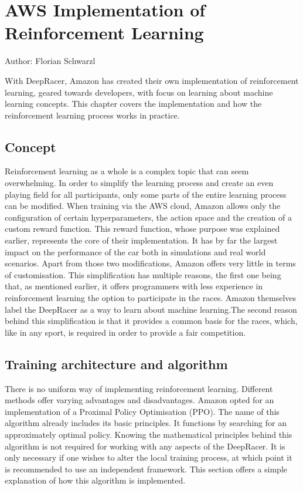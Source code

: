 \chapter{AWS Implementation of Reinforcement Learning}
Author: Florian Schwarzl

With DeepRacer, Amazon has created their own implementation of reinforcement learning, geared towards developers, with focus on learning about machine learning concepts. This chapter covers the implementation and how the reinforcement learning process works in practice.

\section{Concept}
Reinforcement learning as a whole is a complex topic that can seem overwhelming. In order to simplify the learning process and create an even playing field for all participants, only some parts of the entire learning process can be modified. When training via the AWS cloud, Amazon allows only the configuration of certain hyperparameters, the action space and the creation of a custom reward function. This reward function, whose purpose was explained earlier, represents the core of their implementation. It has by far the largest impact on the performance of the car both in simulations and real world scenarios. Apart from those two modifications, Amazon offers very little in terms of customisation. This simplification has multiple reasons, the first one being that, as mentioned earlier, it offers programmers with less experience in reinforcement learning the option to participate in the races. Amazon themselves label the DeepRacer as a way to learn about machine learning.The second reason behind this simplification is that it provides a common basis for the races, which, like in any sport, is required in order to provide a fair competition.

\section{Training architecture and algorithm}
There is no uniform way of implementing reinforcement learning. Different methods offer varying advantages and disadvantages. Amazon opted for an implementation of a Proximal Policy Optimisation (PPO). The name of this algorithm already includes its basic principles. It functions by searching for an approximately optimal policy. Knowing the mathematical principles behind this algorithm is not required for working with any aspects of the DeepRacer. It is only necessary if one wishes to alter the local training process, at which point it is recommended to use an independent framework. This section offers a simple explanation of how this algorithm is implemented.

